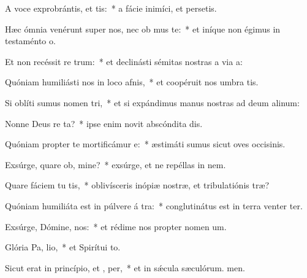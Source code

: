 \item A voce exprobrántis, et tis:~* a fácie inimíci, et persetis.
\item Hæc ómnia venérunt super nos, nec ob mus te:~* et iníque non égimus in testaménto o.
\item Et non recéssit re  trum:~* et declinásti sémitas nostras a via a:
\item Quóniam humiliásti nos in loco afnis,~* et coopéruit nos umbra tis.
\item Si oblíti sumus nomen  tri,~* et si expándimus manus nostras ad deum alinum:
\item Nonne Deus re ta?~* ipse enim novit abscóndita dis.
\item Quóniam propter te mortificámur  e:~* æstimáti sumus sicut oves occisinis.
\item Exsúrge, quare ob, mine?~* exsúrge, et ne repéllas in nem.
\item Quare fáciem tu tis,~* oblivísceris inópiæ nostræ, et tribulatiónis træ?
\item Quóniam humiliáta est in púlvere á tra:~* conglutinátus est in terra venter ter.
\item Exsúrge, Dómine,  nos:~* et rédime nos propter nomen um.
\item Glória Pa,  lio,~* et Spirítui to.
\item Sicut erat in princípio, et ,  per,~* et in sǽcula sæculórum. men.
